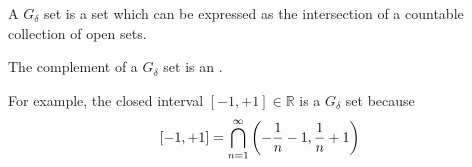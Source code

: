 \documentclass[12pt]{article}
\begin{document}
A $G_\delta$ set is a set which can be expressed as the intersection of a countable collection of open sets.  

The complement of a $G_\delta$ set is an .

For example, the closed interval $[-1,+1] \in \mathbb{R}$ is a $G_\delta$ set because
 $$[-1,+1] = \bigcap_{n=1}^\infty \left( -{1 \over n}-1,{1 \over n}+1 \right)$$
\end{document}
